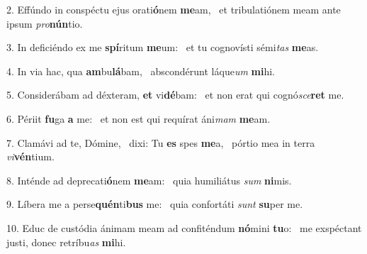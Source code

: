 2. Effúndo in conspéctu ejus orati\textbf{ó}nem \textbf{me}am, \ast\  et tribulatiónem meam ante ipsum \textit{pro}\textbf{nún}tio.\

3. In deficiéndo ex me \textbf{spí}ritum \textbf{me}um: \ast\  et tu cognovísti sémi\textit{tas} \textbf{me}as.\

4. In via hac, qua \textbf{am}bu\textbf{lá}bam, \ast\  abscondérunt láque\textit{um} \textbf{mi}hi.\

5. Considerábam ad déxteram, \textbf{et} vi\textbf{dé}bam: \ast\  et non erat qui cognó\textit{sce}\textbf{ret} me.\

6. Périit \textbf{fu}ga \textbf{a} me: \ast\  et non est qui requírat áni\textit{mam} \textbf{me}am.\

7. Clamávi ad te, Dómine, \dag\  dixi: Tu \textbf{es} spes \textbf{me}a, \ast\  pórtio mea in terra \textit{vi}\textbf{vén}tium.\

8. Inténde ad deprecati\textbf{ó}nem \textbf{me}am: \ast\  quia humiliátus \textit{sum} \textbf{ni}mis.\

9. Líbera me a perse\textbf{quén}ti\textbf{bus} me: \ast\  quia confortáti \textit{sunt} \textbf{su}per me.\

10. Educ de custódia ánimam meam ad confiténdum \textbf{nó}mini \textbf{tu}o: \ast\  me exspéctant justi, donec retríbu\textit{as} \textbf{mi}hi.\

